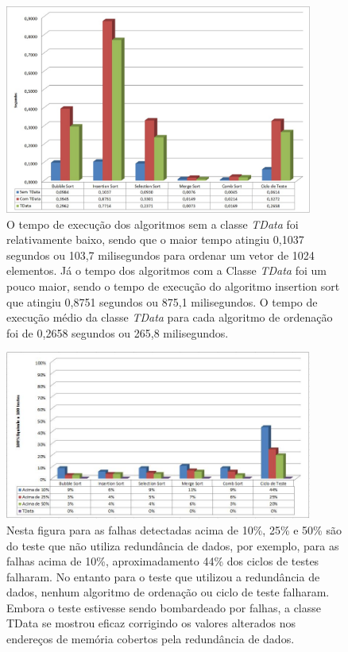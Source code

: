 \begin{figure}[h]
	\centering
	\includegraphics[width=0.9\textwidth]{figuras/tempoTData.jpg}
	\caption[Tempo de execução da Classe \textit{TData}]{O tempo de execução dos algoritmos sem a classe \textit{TData} foi relativamente baixo, sendo que o maior tempo atingiu 0,1037 segundos ou 103,7 milisegundos para ordenar um vetor de 1024 elementos. Já o tempo dos algoritmos com a Classe \textit{TData} foi um pouco maior, sendo o tempo de execução do algoritmo insertion sort que atingiu 0,8751 segundos ou 875,1 milisegundos. O tempo de execução médio da classe \textit{TData} para cada algoritmo de ordenação foi de 0,2658 segundos ou 265,8 milisegundos.}

	\label{Img:tempoTData}	
\end{figure}

\begin{figure}[h]
	\centering
	\includegraphics[width=0.9\textwidth]{figuras/falhaTData.jpg}
	\caption[Teste de redundância de dados da classe \textit{TData}]{Nesta figura para as falhas detectadas acima de 10\%, 25\% e 50\% são do teste que não utiliza redundância de dados, por exemplo, para as falhas acima de 10\%, aproximadamento 44\% dos ciclos de testes falharam. No entanto para o teste que utilizou a redundância de dados, nenhum algoritmo de ordenação ou ciclo de teste falharam. Embora o teste estivesse sendo bombardeado por falhas, a classe TData se mostrou eficaz corrigindo os valores alterados nos endereços de memória cobertos pela redundância de dados.}
	\label{Img:falhaTData}	
\end{figure}

